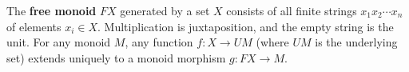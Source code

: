 The \textbf{free monoid} $FX$ generated by a set $X$ consists of all finite strings $x_1 x_2 \cdots x_n$ of elements $x_i \in X$. Multiplication is juxtaposition, and the empty string is the unit. For any monoid $M$, any function $f: X \rightarrow UM$ (where $UM$ is the underlying set) extends uniquely to a monoid morphism $g: FX \rightarrow M$.